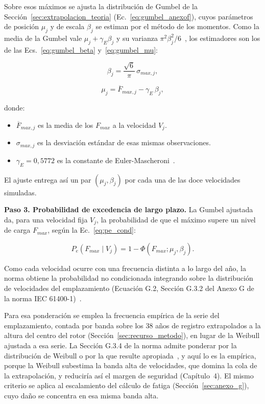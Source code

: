 Sobre esos máximos se ajusta la distribución de Gumbel de la Sección~\ref{sec:extrapolacion_teoria} (Ec.~\ref{eq:gumbel_anexof}), cuyos parámetros de posición $\mu_j$ y de escala $\beta_j$ se estiman por el método de los momentos. Como la media de la Gumbel vale $\mu_j + \gamma_E \beta_j$ y su varianza $\pi^2 \beta_j^2 / 6$~\parencite{Gumbel1958}, los estimadores son los de las Ecs.~\ref{eq:gumbel_beta} y~\ref{eq:gumbel_mu}:

\begin{equation}
    \beta_j = \frac{\sqrt{6}}{\pi}\,\sigma_{max,j},
    \label{eq:gumbel_beta}
\end{equation}

\begin{equation}
    \mu_j = \overline{F}_{max,j} - \gamma_E\,\beta_j,
    \label{eq:gumbel_mu}
\end{equation}

donde:
\begin{itemize}
    \item $\overline{F}_{max,j}$ es la media de los $F_{max}$ a la velocidad $V_j$.
    \item $\sigma_{max,j}$ es la desviación estándar de esas mismas observaciones.
    \item $\gamma_E = 0{,}5772$ es la constante de Euler-Mascheroni~\parencite{NIST_DLMF}.
\end{itemize}

El ajuste entrega así un par $(\mu_j, \beta_j)$ por cada una de las doce velocidades simuladas.

\medskip
\noindent\textbf{Paso 3. Probabilidad de excedencia de largo plazo.}
La Gumbel ajustada da, para una velocidad fija $V_j$, la probabilidad de que el máximo supere un nivel de carga $F_{max}$, según la Ec.~\ref{eq:pe_cond}:

\begin{equation}
    P_e(F_{max} \mid V_j) = 1 - \Phi(F_{max}; \mu_j, \beta_j).
    \label{eq:pe_cond}
\end{equation}

Como cada velocidad ocurre con una frecuencia distinta a lo largo del año, la norma obtiene la probabilidad no condicionada integrando sobre la distribución de velocidades del emplazamiento (Ecuación G.2, Sección G.3.2 del Anexo G de la norma IEC 61400-1)~\parencite*{IEC61400-1}.

Para esa ponderación se emplea la frecuencia empírica de la serie del emplazamiento, contada por banda sobre los $38$ años de registro extrapolados a la altura del centro del rotor (Sección~\ref{sec:recurso_metodo}), en lugar de la Weibull ajustada a esa serie. La Sección G.3.4 de la norma admite ponderar por la distribución de Weibull o por la que resulte apropiada~\parencite{IEC61400-1}, y aquí lo es la empírica, porque la Weibull subestima la banda alta de velocidades, que domina la cola de la extrapolación, y reduciría así el margen de seguridad (Capítulo~4). El mismo criterio se aplica al escalamiento del cálculo de fatiga (Sección~\ref{sec:anexo_g}), cuyo daño se concentra en esa misma banda alta.

